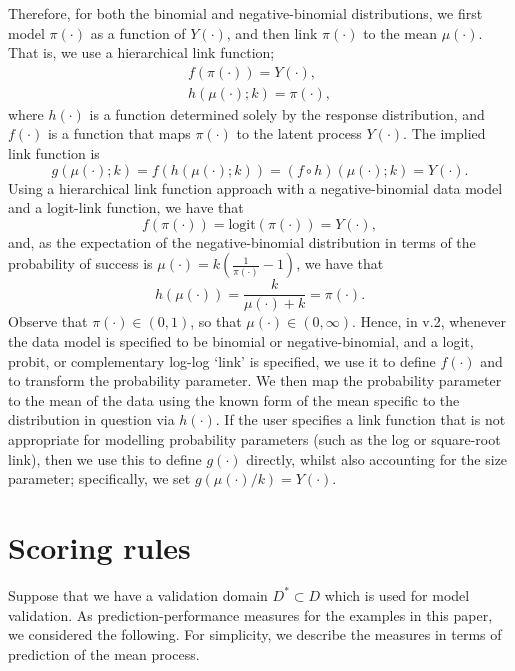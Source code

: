 \documentclass[nojss]{jss}
\newcommand{\logit}[1]{\text{logit}\!\left(#1\right)} %
\begin{document}
\begin{appendix}
Therefore, for both the binomial and negative-binomial distributions, we first model $\pi(\cdot)$ as a function of $Y(\cdot)$, and then link $\pi(\cdot)$ to the mean $\mu(\cdot)$. 
That is, we use a hierarchical link function;
\begin{gather*}
    f(\pi(\cdot)) = Y(\cdot),\\
    h(\mu(\cdot); k) = \pi(\cdot), 
\end{gather*}
where $h(\cdot)$ is a function determined solely by the response distribution, and $f(\cdot)$ is a function that maps $\pi(\cdot)$ to the latent process $Y(\cdot)$.  
The implied link function is
\[
g(\mu(\cdot); k) = f(h(\mu(\cdot); k)) = (f \circ h)(\mu(\cdot); k) = Y(\cdot).
\]
Using a hierarchical link function approach with a negative-binomial data model and a logit-link function, we have that
\[
f(\pi(\cdot)) = \logit{\pi(\cdot)} = Y(\cdot),
\]
and, as the expectation of the negative-binomial distribution in terms of the probability of success is $\mu(\cdot) = k\left(\frac{1}{\pi(\cdot)} - 1\right)$, we have that
\[
h(\mu(\cdot)) = \frac{k}{\mu(\cdot) + k} = \pi(\cdot).
\]
Observe that $\pi(\cdot) \in (0, 1)$, so that $\mu(\cdot) \in (0, \infty)$. 
Hence, in  v.2, whenever the data model is specified to be binomial or negative-binomial, and a logit, probit, or complementary log-log `link' is specified, we use it to define $f(\cdot)$ and to transform the probability parameter. 
We then map the probability parameter to the mean of the data using the known form of the mean specific to the distribution in question via $h(\cdot)$. 
If the user specifies a link function  that is not appropriate for modelling probability parameters (such as the log or square-root link), then we use this to define $g(\cdot)$ directly, whilst also accounting for the size parameter; specifically, we set $g(\mu(\cdot) / k) = Y(\cdot)$.


\section{Scoring rules}\label{app:ScoringRules}

Suppose that we have a validation domain $D^* \subset D$ which is used for model validation.
As prediction-performance measures for the examples in this paper, we considered the following. 
For simplicity, we describe the measures in terms of prediction of the mean process.



\end{appendix}
\end{document}
